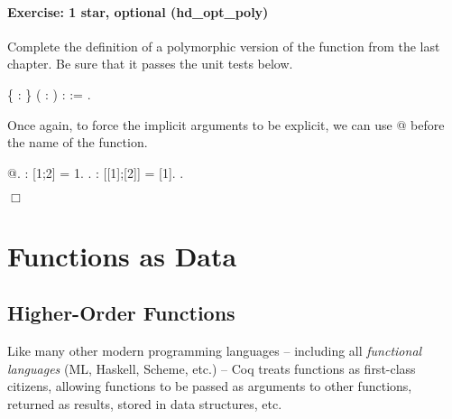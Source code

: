\documentclass[12pt]{report}
\begin{document}
\paragraph{Exercise: 1 star, optional (hd\_opt\_poly)}

 Complete the definition of a polymorphic version of the
     function from the last chapter. Be sure that it
    passes the unit tests below. \begin{coqdoccode}
\coqdocemptyline
\coqdocnoindent
{}  \{ : \} ( :  )  :   :=\coqdoceol
\coqdocindent{1.00em}
 .\coqdoceol
\coqdocemptyline
\end{coqdoccode}
Once again, to force the implicit arguments to be explicit,
    we can use @ before the name of the function. \begin{coqdoccode}
\coqdocemptyline
\coqdocnoindent
{} @.\coqdoceol
\coqdocemptyline
\coqdocnoindent
{}  :   [1;2] =  1.\coqdoceol
 .\coqdoceol
\coqdocnoindent
{}  :     [[1];[2]]  =  [1].\coqdoceol
 .\coqdoceol
\end{coqdoccode}
\ensuremath{\Box} \begin{coqdoccode}
\coqdocemptyline
\end{coqdoccode}
\section{Functions as Data}

\begin{coqdoccode}
\end{coqdoccode}
\subsection{Higher-Order Functions}



 Like many other modern programming languages -- including
    all \textit{functional languages} (ML, Haskell, Scheme, etc.) -- Coq
    treats functions as first-class citizens, allowing functions to be
    passed as arguments to other functions, returned as results,
    stored in data structures, etc.
\end{document}
